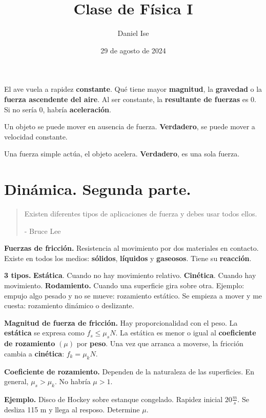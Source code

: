 \documentclass{article}
\title{Clase de Física I}
\author{Daniel Ise}
\date{29 de agosto de 2024}
\begin{document}
\maketitle

El ave vuela a rapidez \textbf{constante}. Qué tiene mayor \textbf{magnitud}, la
\textbf{gravedad} o la \textbf{fuerza ascendente del aire}. Al ser constante, la
\textbf{resultante de fuerzas} es 0. Si no sería 0, habría \textbf{aceleración}.

Un objeto se puede mover en ausencia de fuerza. \textbf{Verdadero}, se puede
mover a velocidad constante.

Una fuerza simple actúa, el objeto acelera. \textbf{Verdadero}, es una sola
fuerza.

\section*{Dinámica. Segunda parte.}

\begin{quote}
    Existen diferentes tipos de aplicaciones de fuerza y debes usar todos ellos.

    \raggedleft - Bruce Lee
\end{quote}

\textbf{Fuerzas de fricción.} Resistencia al movimiento por dos materiales en
contacto. Existe en todos los medios: \textbf{sólidos}, \textbf{líquidos} y
\textbf{gaseosos}. Tiene su \textbf{reacción}.

\textbf{3 tipos.} \textbf{Estática}. Cuando no hay movimiento relativo.
\textbf{Cinética}. Cuando hay movimiento. \textbf{Rodamiento.} Cuando una
superficie gira sobre otra. Ejemplo: empujo algo pesado y no se mueve:
rozamiento estático. Se empieza a mover y me cuesta: rozamiento dinámico o
deslizante.

\textbf{Magnitud de fuerza de fricción.} Hay proporcionalidad con el peso.
La \textbf{estática} se expresa como \(f_{s} \leq \mu_s N\). La estática es
menor o igual al \textbf{coeficiente de rozamiento} \((\mu)\) por \textbf{peso}.
Una vez que arranca a moverse, la fricción cambia a \textbf{cinética}:
\(f_k = \mu_k N\).

\textbf{Coeficiente de rozamiento.} Dependen de la naturaleza de las
superficies. En general, \(\mu_s > \mu_k\). No habría \(\mu > 1\).

\textbf{Ejemplo.} Disco de Hockey sobre estanque congelado. Rapidez inicial
\(20 \frac{m}{s}\). Se desliza 115 m y llega al resposo. Determine \(\mu\).
\end{document}
